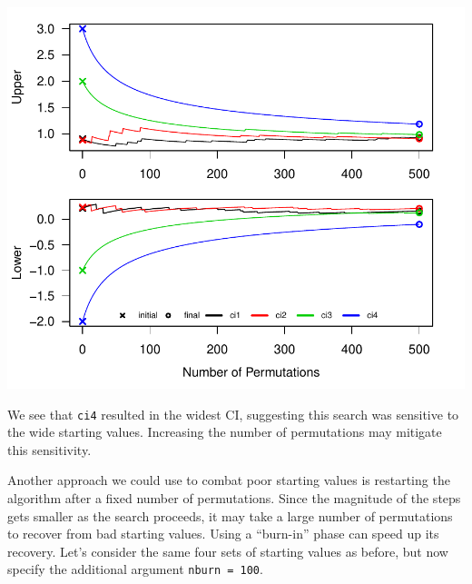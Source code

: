\documentclass[12pt]{article}\usepackage[]{graphicx}\usepackage[]{color}
\makeatletter
\def\maxwidth{ %
  \ifdim\Gin@nat@width>\linewidth
    \linewidth
  \else
    \Gin@nat@width
  \fi
}
\newenvironment{knitrout}{}{} %
\makeatother
\begin{document}
\begin{knitrout}
\color{fgcolor}

{\centering \includegraphics[width=\maxwidth]{figure/ci_plots-1} 

}



\end{knitrout}
We see that \texttt{ci4} resulted in the widest CI, suggesting this search was sensitive to the wide starting values. Increasing the number of permutations may mitigate this sensitivity.

Another approach we could use to combat poor starting values is restarting the algorithm after a fixed number of permutations. Since the magnitude of the steps gets smaller as the search proceeds, it may take a large number of permutations to recover from bad starting values. Using a ``burn-in'' phase can speed up its recovery. Let's consider the same four sets of starting values as before, but now specify the additional argument \texttt{nburn = 100}.
\end{document}
